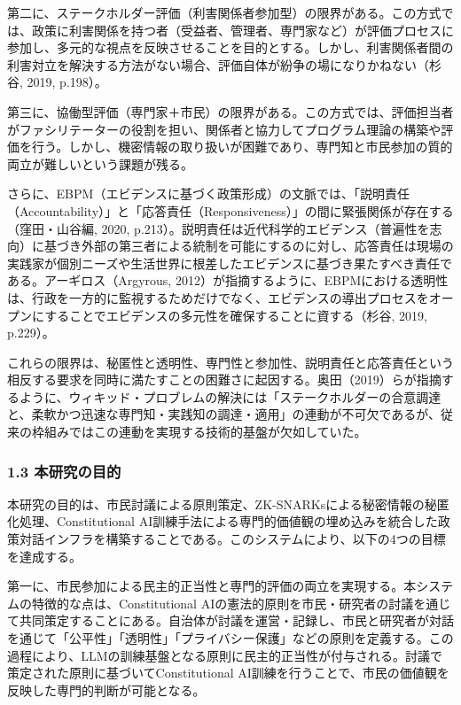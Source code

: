 第二に、ステークホルダー評価（利害関係者参加型）の限界がある。この方式では、政策に利害関係を持つ者（受益者、管理者、専門家など）が評価プロセスに参加し、多元的な視点を反映させることを目的とする。しかし、利害関係者間の利害対立を解決する方法がない場合、評価自体が紛争の場になりかねない（杉谷, 2019, p.198）。

第三に、協働型評価（専門家＋市民）の限界がある。この方式では、評価担当者がファシリテーターの役割を担い、関係者と協力してプログラム理論の構築や評価を行う。しかし、機密情報の取り扱いが困難であり、専門知と市民参加の質的両立が難しいという課題が残る。

さらに、EBPM（エビデンスに基づく政策形成）の文脈では、「説明責任（Accountability）」と「応答責任（Responsiveness）」の間に緊張関係が存在する（窪田・山谷編, 2020, p.213）。説明責任は近代科学的エビデンス（普遍性を志向）に基づき外部の第三者による統制を可能にするのに対し、応答責任は現場の実践家が個別ニーズや生活世界に根差したエビデンスに基づき果たすべき責任である。アーギロス（Argyrous, 2012）が指摘するように、EBPMにおける透明性は、行政を一方的に監視するためだけでなく、エビデンスの導出プロセスをオープンにすることでエビデンスの多元性を確保することに資する（杉谷, 2019, p.229）。

これらの限界は、秘匿性と透明性、専門性と参加性、説明責任と応答責任という相反する要求を同時に満たすことの困難さに起因する。奥田（2019）らが指摘するように、ウィキッド・プロブレムの解決には「ステークホルダーの合意調達と、柔軟かつ迅速な専門知・実践知の調達・適用」の連動が不可欠であるが、従来の枠組みではこの連動を実現する技術的基盤が欠如していた。

\subsubsection{1.3 本研究の目的}\label{ux672cux7814ux7a76ux306eux76eeux7684}

本研究の目的は、市民討議による原則策定、ZK-SNARKsによる秘密情報の秘匿化処理、Constitutional AI訓練手法による専門的価値観の埋め込みを統合した政策対話インフラを構築することである。このシステムにより、以下の4つの目標を達成する。

第一に、市民参加による民主的正当性と専門的評価の両立を実現する。本システムの特徴的な点は、Constitutional AIの憲法的原則を市民・研究者の討議を通じて共同策定することにある。自治体が討議を運営・記録し、市民と研究者が対話を通じて「公平性」「透明性」「プライバシー保護」などの原則を定義する。この過程により、LLMの訓練基盤となる原則に民主的正当性が付与される。討議で策定された原則に基づいてConstitutional AI訓練を行うことで、市民の価値観を反映した専門的判断が可能となる。

